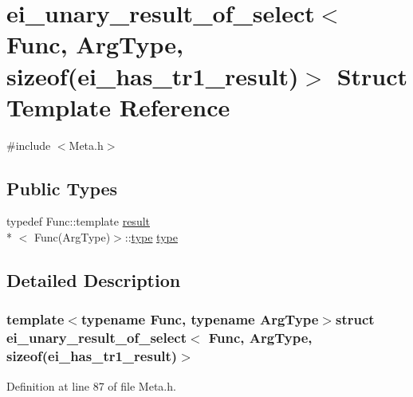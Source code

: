\hypertarget{structei__unary__result__of__select_3_01_func_00_01_arg_type_00_01sizeof_07ei__has__tr1__result_08_4}{\section{ei\-\_\-unary\-\_\-result\-\_\-of\-\_\-select$<$ Func, Arg\-Type, sizeof(ei\-\_\-has\-\_\-tr1\-\_\-result)$>$ Struct Template Reference}
\label{structei__unary__result__of__select_3_01_func_00_01_arg_type_00_01sizeof_07ei__has__tr1__result_08_4}
}


{\ttfamily \#include $<$Meta.\-h$>$}

\subsection*{Public Types}
\begin{DoxyCompactItemize}
\item 
typedef Func\-::template \hyperlink{qxtslotjob_8h_aab161efab0511ea9612b64c40e9852ca}{result}\\*
$<$ Func(Arg\-Type)$>$\-::\hyperlink{structei__unary__result__of__select_3_01_func_00_01_arg_type_00_01sizeof_07ei__has__tr1__result_08_4_a27b1fd29094372b6063fb794dc9484ad}{type} \hyperlink{structei__unary__result__of__select_3_01_func_00_01_arg_type_00_01sizeof_07ei__has__tr1__result_08_4_a27b1fd29094372b6063fb794dc9484ad}{type}
\end{DoxyCompactItemize}


\subsection{Detailed Description}
\subsubsection*{template$<$typename Func, typename Arg\-Type$>$struct ei\-\_\-unary\-\_\-result\-\_\-of\-\_\-select$<$ Func, Arg\-Type, sizeof(ei\-\_\-has\-\_\-tr1\-\_\-result)$>$}



Definition at line 87 of file Meta.\-h.




